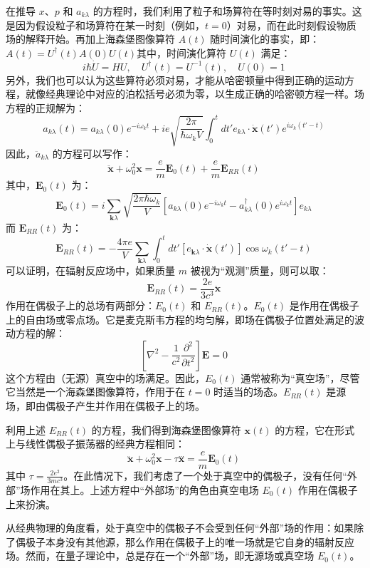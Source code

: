 在推导 \( x \)、\( p \) 和 \( a_{k\lambda} \) 的方程时，我们利用了粒子和场算符在等时刻对易的事实。这是因为假设粒子和场算符在某一时刻（例如，\( t = 0 \)）对易，而在此时刻假设物质场的解释开始。再加上海森堡图像算符 \( A(t) \) 随时间演化的事实，即：\(A(t) = U^{\dagger}(t) A(0) U(t)\)其中，时间演化算符 \( U(t) \) 满足：
\[
i\hbar \dot{U} = H U, \quad U^{\dagger}(t) = U^{-1}(t), \quad U(0) = 1~
\]
另外，我们也可以认为这些算符必须对易，才能从哈密顿量中得到正确的运动方程，就像经典理论中对应的泊松括号必须为零，以生成正确的哈密顿方程一样。场方程的正规解为：
\[
a_{k\lambda}(t) = a_{k\lambda}(0) e^{-i\omega_k t} + ie \sqrt{\frac{2\pi}{\hbar \omega_k V}} \int_0^t dt' e_{k\lambda} \cdot \dot{\mathbf{x}}(t') e^{i\omega_k(t' - t)}~
\]
因此，\( \ddot{a}_{k\lambda} \) 的方程可以写作：
\[
\ddot{\mathbf{x}} + \omega_0^2 \mathbf{x} = \frac{e}{m} \mathbf{E}_0(t) + \frac{e}{m} \mathbf{E}_{RR}(t)~
\]
其中，\( \mathbf{E}_0(t) \) 为：
\[
\mathbf{E}_0(t) = i \sum_{\mathbf{k} \lambda} \sqrt{\frac{2\pi \hbar \omega_k}{V}} \left[ a_{k\lambda}(0) e^{-i\omega_k t} - a_{k\lambda}^{\dagger}(0) e^{i\omega_k t} \right] e_{k\lambda}~
\]
而 \( \mathbf{E}_{RR}(t) \) 为：
\[
\mathbf{E}_{RR}(t) = -\frac{4\pi e}{V} \sum_{\mathbf{k} \lambda} \int_0^t dt' \left[ e_{\mathbf{k} \lambda} \cdot \dot{\mathbf{x}}(t') \right] \cos \omega_k (t' - t)~
\]
可以证明，在辐射反应场中，如果质量 \( m \) 被视为“观测”质量，则可以取：
\[
\mathbf{E}_{RR}(t) = \frac{2e}{3c^3} \ddot{\mathbf{x}}~
\]
作用在偶极子上的总场有两部分：\( E_0(t) \) 和 \( E_{RR}(t) \)。\( E_0(t) \) 是作用在偶极子上的自由场或零点场。它是麦克斯韦方程的均匀解，即场在偶极子位置处满足的波动方程的解：
\[
\left[ \nabla^2 - \frac{1}{c^2} \frac{\partial^2}{\partial t^2} \right] \mathbf{E} = 0~
\]
这个方程由（无源）真空中的场满足。因此，\( E_0(t) \) 通常被称为“真空场”，尽管它当然是一个海森堡图像算符，作用于在 \( t = 0 \) 时适当的场态。\( E_{RR}(t) \) 是源场，即由偶极子产生并作用在偶极子上的场。

利用上述 \( E_{RR}(t) \) 的方程，我们得到海森堡图像算符 \( \mathbf{x}(t) \) 的方程，它在形式上与线性偶极子振荡器的经典方程相同：
\[
\ddot{\mathbf{x}} + \omega_0^2 \mathbf{x} - \tau \overset{...}{\mathbf{x}} = \frac{e}{m} \mathbf{E}_0(t)~
\]
其中 \( \tau = \frac{2e^2}{3mc^3} \)。在此情况下，我们考虑了一个处于真空中的偶极子，没有任何“外部”场作用在其上。上述方程中“外部场”的角色由真空电场 \( E_0(t) \) 作用在偶极子上来扮演。

从经典物理的角度看，处于真空中的偶极子不会受到任何“外部”场的作用：如果除了偶极子本身没有其他源，那么作用在偶极子上的唯一场就是它自身的辐射反应场。然而，在量子理论中，总是存在一个“外部”场，即无源场或真空场 \( E_0(t) \)。

